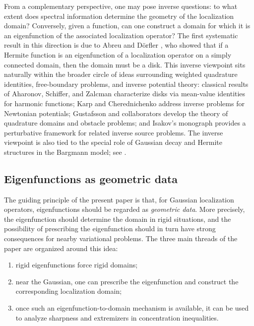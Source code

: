 \documentclass[a4paper,11pt,reqno]{amsart}
\numberwithin{equation}{section}
\theoremstyle{plain} %
\theoremstyle{definition} %
\theoremstyle{remark}
\begin{document}
From a complementary perspective, one may pose inverse questions: to what extent does spectral information determine the geometry of the localization domain? Conversely, given a function, can one construct a domain for which it is an eigenfunction of the associated localization operator? The first systematic result in this direction is due to Abreu and D\"orfler \cite{Abreu-Doerfler}, who showed that if a Hermite function is an eigenfunction of a localization operator on a simply connected domain, then the domain must be a disk. This inverse viewpoint sits naturally within the broader circle of ideas surrounding weighted quadrature identities, free-boundary problems, and inverse potential theory: classical results of Aharonov, Schiffer, and Zalcman \cite{Aharonov-Schiffer-Zalcman} characterize disks via mean-value identities for harmonic functions; Karp \cite{Karp} and Cherednichenko \cite{Cherednichenko} address inverse problems for Newtonian potentials; Gustafsson and collaborators \cite{Gustafsson,Gustafsson-Shahgholian,Shahgholian} develop the theory of quadrature domains and obstacle problems; and Isakov's monograph \cite{Isakov} provides a perturbative framework for related inverse source problems. The inverse viewpoint is also tied to the special role of Gaussian decay and Hermite structures in the Bargmann model; see \cite{Kulikov-Oliveira-Ramos,Goncalves-Oliveira-Steinerberger,Thangavelu}.

\subsection{Eigenfunctions as geometric data}

The guiding principle of the present paper is that, for Gaussian localization operators, eigenfunctions should be regarded as \emph{geometric data}. More precisely, the eigenfunction should determine the domain in rigid situations, and the possibility of prescribing the eigenfunction should in turn have strong consequences for nearby variational problems. The three main threads of the paper are organized around this idea:
\begin{enumerate}
\item rigid eigenfunctions force rigid domains;
\item near the Gaussian, one can prescribe the eigenfunction and construct the corresponding localization domain;
\item once such an eigenfunction-to-domain mechanism is available, it can be used to analyze sharpness and extremizers in concentration inequalities.
\end{enumerate}
\end{document}
